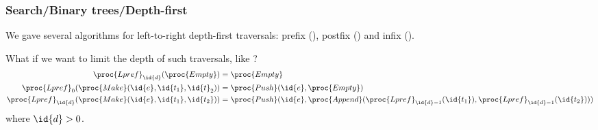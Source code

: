 %
\begin{frame}
\frametitle{Search/Binary trees/Depth-first}

We gave several algorithms for left-to-right depth-first traversals:
prefix (), postfix () and infix ().

\bigskip

What if we want to limit the depth of such traversals, like
?
{\footnotesize
\begin{align*}
   \proc{Lpref}_{\id{d}} (\proc{Empty}) 
&= \proc{Empty}\\
   \proc{Lpref}_{0} (\proc{Make} (\id{e}, \id{t_1}, \id{t}_2))
&= \proc{Push} (\id{e}, \proc{Empty})\\
   \proc{Lpref}_{\id{d}} (\proc{Make} (\id{e}, \id{t_1}, \id{t_2})) 
&= \proc{Push} (\id{e}, \proc{Append} (\proc{Lpref}_{\id{d}-1}
   (\id{t_1}), \proc{Lpref}_{\id{d}-1} (\id{t_2})))
\end{align*}
}
where \(\id{d} > 0\).

\end{frame}
